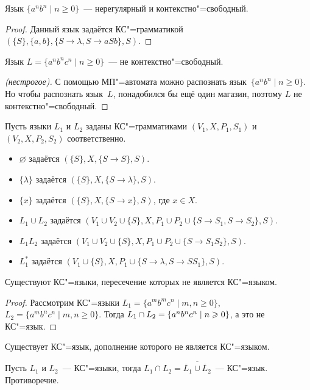 \begin{statement}
Язык $\{ a^n b^n \mid n \geqslant 0 \}$~--- нерегулярный и контекстно"=свободный.
\end{statement}
\begin{proof}
Данный язык задаётся КС"=грамматикой~$(\{ S \}, \{ a, b \}, \{ S \to \lambda, S \to aSb \}, S)$.
\end{proof}

\begin{statement}
Язык $L = \{ a^n b^n c^n \mid n \geqslant 0 \}$~--- не контекстно"=свободный.
\end{statement}
\begin{proof}[(нестрогое)]
С помощью МП"=автомата можно распознать язык~$\{ a^n b^n \mid n \geqslant 0 \}$.
Но чтобы распознать язык~$L$, понадобился бы ещё один магазин, поэтому $L$ не контекстно"=свободный.
\end{proof}

Пусть языки $L_1$ и $L_2$ заданы КС"=грамматиками $(V_1, X, P_1, S_1)$ и $(V_2, X, P_2, S_2)$ соответственно.
\begin{itemize}
	\item $\varnothing$ задаётся $(\{ S \}, X, \{ S \to S \}, S)$.
	\item $\{ \lambda \}$ задаётся $(\{ S \}, X, \{ S \to \lambda \}, S)$.
	\item $\{ x \}$ задаётся $(\{ S \}, X, \{ S \to x \}, S)$, где $x \in X$.
	\item $L_1 \cup L_2$ задаётся $(V_1 \cup V_2 \cup \{ S \}, X, P_1 \cup P_2 \cup \{ S \to S_1, S \to S_2 \}, S)$.
	\item $L_1 L_2$ задаётся $(V_1 \cup V_2 \cup \{ S \}, X, P_1 \cup P_2 \cup \{ S \to S_1 S_2 \}, S)$.
	\item $L_1^*$ задаётся $(V_1 \cup \{ S \}, X, P_1 \cup \{ S \to \lambda, S \to S S_1 \}, S)$.
\end{itemize}

\begin{statement}
Существуют КС"=языки, пересечение которых не является КС"=языком.
\end{statement}
\begin{proof}
Рассмотрим КС"=языки $L_1 = \{ a^m b^m c^n \mid m, n \geqslant 0 \}$, $L_2 = \{ a^m b^n c^n \mid m, n \geqslant 0 \}$.
Тогда $L_1 \cap L_2 \opbr= \{ a^n b^n c^n \mid n \geqslant 0 \}$, а это не КС"=язык.
\end{proof}

\begin{consequent}
Существует КС"=язык, дополнение которого не является КС"=языком.
\end{consequent}
\begin{proofcontra}
Пусть $L_1$ и $L_2$~--- КС"=языки, тогда $L_1 \cap L_2 = \overline{\overline L_1 \cup \overline L_2}$~--- КС"=язык.
Противоречие.
\end{proofcontra}
